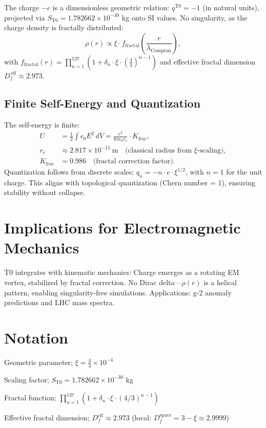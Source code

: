 	The charge $-e$ is a dimensionless geometric relation: $q^{\mathrm{T0}} = -1$ (in natural units), projected via $S_{\mathrm{T0}} = 1.782662 \times 10^{-30}$ kg onto SI values. No singularity, as the charge density is fractally distributed:
	\begin{equation}
		\rho(r) \propto \xi \cdot f_{\text{fractal}}\left( \frac{r}{\lambda_{\text{Compton}}} \right),
	\end{equation}
	with $f_{\text{fractal}}(r) = \prod_{n=1}^{137} \left(1 + \delta_n \cdot \xi \cdot \left(\frac{4}{3}\right)^{n-1}\right)$ and effective fractal dimension $D_f^{\,\text{eff}} \approx 2.973$.
	
	\subsection{Finite Self-Energy and Quantization}
	The self-energy is finite:
	\begin{align}
		U &= \frac{1}{2} \int \epsilon_0 E^2 \, dV = \frac{e^2}{8\pi \epsilon_0 r_e} \cdot K_{\text{frac}}, \\
		r_e &\approx 2.817 \times 10^{-15}~\mathrm{m} \quad \text{(classical radius from $\xi$-scaling)}, \\
		K_{\text{frac}} &= 0.986 \quad \text{(fractal correction factor)}.
	\end{align}
	Quantization follows from discrete scales: $q_n = -n \cdot e \cdot \xi^{1/2}$, with $n=1$ for the unit charge. This aligns with topological quantization (Chern number = 1), ensuring stability without collapse.
	
	\section{Implications for Electromagnetic Mechanics}
	\label{sec:emm}
	
	T0 integrates with kinematic mechanics: Charge emerges as a rotating EM vortex, stabilized by fractal correction. No Dirac delta—$\rho(r)$ is a helical pattern, enabling singularity-free simulations. Applications: g-2 anomaly predictions and LHC mass spectra.
	
	\section{Notation}
	\begin{description}[leftmargin=1cm]
		\item[$\xi$] Geometric parameter; $\xi = \frac{4}{3} \times 10^{-4}$
		\item[$S_{\mathrm{T0}}$] Scaling factor; $S_{\mathrm{T0}} = 1.782662 \times 10^{-30}$ kg
		\item[$f_{\text{fractal}}$] Fractal function; $\prod_{n=1}^{137} (1 + \delta_n \cdot \xi \cdot (4/3)^{n-1})$
		\item[$D_f^{\text{eff}}$] Effective fractal dimension; $D_f^{\text{eff}} \approx 2.973$ (local: $D_f^{\text{space}} = 3 - \xi \approx 2.9999$)
	\end{description}
	
	\begin{center}
	\end{center}
